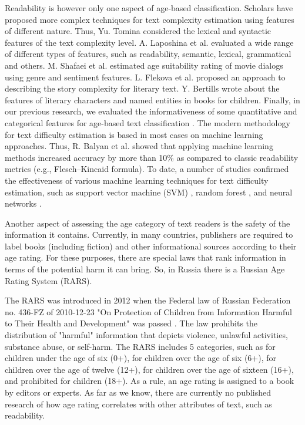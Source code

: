 \documentclass[runningheads]{llncs}
\begin{document}
Readability is however only one aspect of age-based classification. Scholars have proposed more complex techniques for text complexity estimation using features of different nature. Thus, Yu. Tomina \cite{Tomina} considered the lexical and syntactic features of the text complexity level. A. Laposhina et al. \cite{Laposhina} evaluated a wide range of different types of features, such as readability, semantic, lexical, grammatical and others. M. Shafaei et al. \cite{Shafaei} estimated age suitability rating of movie dialogs using genre and sentiment features. L. Flekova et al. \cite{Flekova} proposed an approach to describing the story complexity for literary text. Y. Bertills \cite{Bertills} wrote about the features of literary characters and named entities in books for children. Finally, in our previous research, we evaluated the informativeness of some quantitative and categorical features for age-based text classification \cite{Glazkova}. The modern methodology for text difficulty estimation is based in most cases on machine learning approaches. Thus, R. Balyan et al. \cite{Balyan} showed that applying machine learning methods increased accuracy by more than 10\% as compared to classic readability metrics (e.g., Flesch–Kincaid formula). To date, a number of studies confirmed the effectiveness of various machine learning techniques for text difficulty estimation, such as support vector machine (SVM) \cite{Schwarm,Sung}, random forest \cite{Mukherjee}, and neural networks \cite{Azpiazu,Cuzzocrea,Schicchi}.

Another aspect of assessing the age category of text readers is the safety of the information it contains. Currently, in many countries, publishers are required to label books (including fiction) and other informational sources \cite{ars3,ars5,ars4,ars2,ars1} according to their age rating. For these purposes, there are special laws that rank information in terms of the potential harm it can bring. So, in Russia there is a Russian Age Rating System (RARS).

The RARS was introduced in 2012 when the Federal law of Russian Federation no. 436-FZ of 2010-12-23 "On Protection of Children from Information Harmful to Their Health and Development" was passed \cite{law}. The law prohibits the distribution of "harmful" information that depicts violence, unlawful activities, substance abuse, or self-harm. The RARS includes 5 categories, such as for children under the age of six (0+), for children over the age of six (6+), for children over the age of twelve (12+), for children over the age of sixteen (16+), and prohibited for children (18+). As a rule, an age rating is assigned to a book by editors or experts. As far as we know, there are currently no published research of how age rating correlates with other attributes of text, such as readability.
\end{document}
